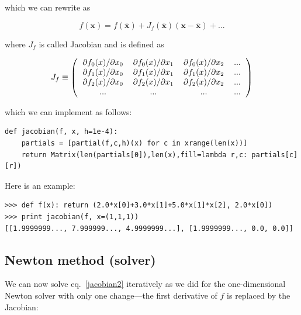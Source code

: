 \documentclass[justified,sixbynine]{tufte-book}
\def\ft{\small\tt}
\theoremstyle{plain}%
\theoremstyle{definition}
\theoremstyle{remark}
\begin{document}
\begin{fullwidth}
which we can rewrite as

\begin{equation}
f(\mathbf{x}) = f(\mathbf{\bar x}) + J_f(\mathbf{\bar x})(\mathbf{x}-\mathbf{\bar x}) + ... \label{jacobian2}
\end{equation}

where $J_f$ is called Jacobian and is defined as

\begin{equation}
J_f \equiv
\left(
\begin{tabular}{cccc}
$\partial f_0(x)/\partial x_0$ &
$\partial f_0(x)/\partial x_1$ &
$\partial f_0(x)/\partial x_2$ &
... \\
$\partial f_1(x)/\partial x_0$ &
$\partial f_1(x)/\partial x_1$ &
$\partial f_1(x)/\partial x_2$ &
... \\
$\partial f_2(x)/\partial x_0$ &
$\partial f_2(x)/\partial x_1$ &
$\partial f_2(x)/\partial x_2$ &
... \\
... & ... & ... & ...
\end{tabular}
\right)
\end{equation}

which we can implement as follows:

\begin{lstlisting}[caption={in file: {\ft nlib.py}}]
def jacobian(f, x, h=1e-4):
    partials = [partial(f,c,h)(x) for c in xrange(len(x))]
    return Matrix(len(partials[0]),len(x),fill=lambda r,c: partials[c][r])
\end{lstlisting}

Here is an example:

\begin{lstlisting}[caption={in file: {\ft nlib.py}}]
>>> def f(x): return (2.0*x[0]+3.0*x[1]+5.0*x[1]*x[2], 2.0*x[0])
>>> print jacobian(f, x=(1,1,1))
[[1.9999999..., 7.999999..., 4.9999999...], [1.9999999..., 0.0, 0.0]]
\end{lstlisting}

\goodbreak\subsection{Newton method (solver)}


We can now solve eq.~\ref{jacobian2} iteratively as we did for the one-dimensional Newton solver with only one change---the first derivative of $f$ is replaced by the Jacobian:


\end{fullwidth}
\end{document}
